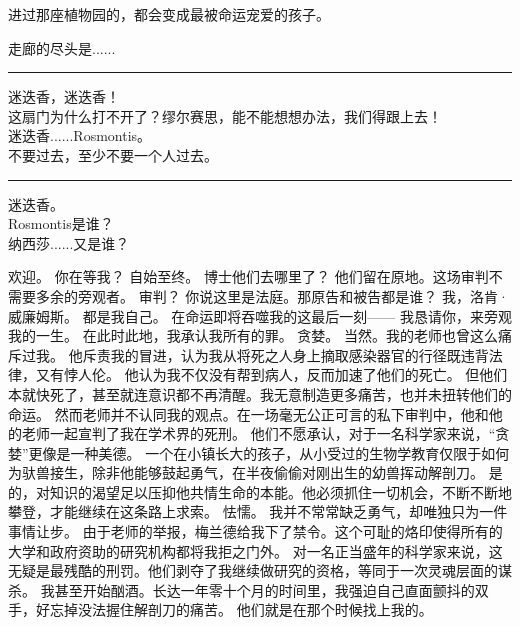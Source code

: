\documentclass[openany]{book}
\begin{document}
\begin{dialogue}
     进过那座植物园的，都会变成最被命运宠爱的孩子。\par
    走廊的尽头是......
    \par\noindent\rule{\textwidth}{0.4pt}
    迷迭香，迷迭香！\\
    这扇门为什么打不开了？缪尔赛思，能不能想想办法，我们得跟上去！\\
    迷迭香......Rosmontis。\\
    不要过去，至少不要一个人过去。
    \par\noindent\rule{\textwidth}{0.4pt}
    迷迭香。\\
    Rosmontis是谁？\\
    纳西莎......又是谁？
\end{dialogue}


\begin{dialogue}
     欢迎。
     你在等我？
     自始至终。
     博士他们去哪里了？
     他们留在原地。这场审判不需要多余的旁观者。
     审判？
     你说这里是法庭。那原告和被告都是谁？
     我，洛肯·威廉姆斯。
     都是我自己。
     在命运即将吞噬我的这最后一刻——
     我恳请你，来旁观我的一生。
     在此时此地，我承认我所有的罪。
     贪婪。
     当然。我的老师也曾这么痛斥过我。
     他斥责我的冒进，认为我从将死之人身上摘取感染器官的行径既违背法律，又有悖人伦。
     他认为我不仅没有帮到病人，反而加速了他们的死亡。
     但他们本就快死了，甚至就连意识都不再清醒。我无意制造更多痛苦，也并未扭转他们的命运。
     然而老师并不认同我的观点。在一场毫无公正可言的私下审判中，他和他的老师一起宣判了我在学术界的死刑。
     他们不愿承认，对于一名科学家来说，“贪婪”更像是一种美德。
     一个在小镇长大的孩子，从小受过的生物学教育仅限于如何为驮兽接生，除非他能够鼓起勇气，在半夜偷偷对刚出生的幼兽挥动解剖刀。
     是的，对知识的渴望足以压抑他共情生命的本能。他必须抓住一切机会，不断不断地攀登，才能继续在这条路上求索。
     怯懦。
     我并不常常缺乏勇气，却唯独只为一件事情让步。
     由于老师的举报，梅兰德给我下了禁令。这个可耻的烙印使得所有的大学和政府资助的研究机构都将我拒之门外。
     对一名正当盛年的科学家来说，这无疑是最残酷的刑罚。他们剥夺了我继续做研究的资格，等同于一次灵魂层面的谋杀。
     我甚至开始酗酒。长达一年零十个月的时间里，我强迫自己直面颤抖的双手，好忘掉没法握住解剖刀的痛苦。
     他们就是在那个时候找上我的。

\end{dialogue}
\end{document}
